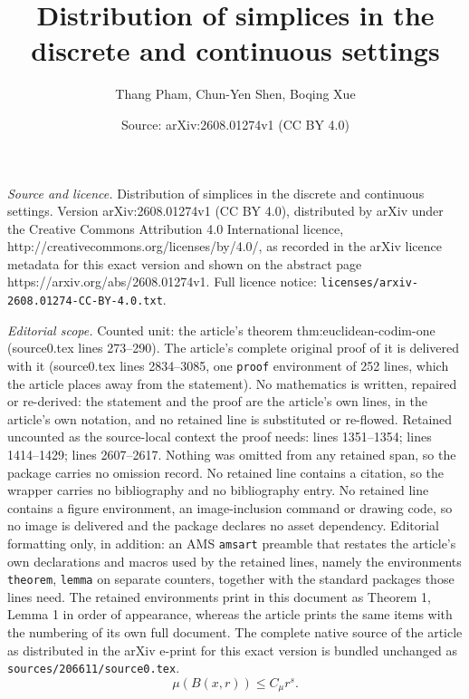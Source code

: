 \documentclass[10pt,a4paper]{amsart}
\title{Distribution of simplices in the discrete and continuous settings}
\author{Thang Pham, Chun-Yen Shen, Boqing Xue}
\date{Source: arXiv:2608.01274v1 (CC BY 4.0)}
\begin{document}
\maketitle

\noindent\emph{Source and licence.} Distribution of simplices in the discrete and continuous settings. Version arXiv:2608.01274v1 (CC BY 4.0), distributed by arXiv under the Creative Commons Attribution 4.0 International licence, http://creativecommons.org/licenses/by/4.0/, as recorded in the arXiv licence metadata for this exact version and shown on the abstract page https://arxiv.org/abs/2608.01274v1. Full licence notice: \texttt{licenses/arxiv-2608.01274-CC-BY-4.0.txt}.\par\smallskip

\noindent\textit{Editorial scope.} Counted unit: the article's theorem thm:euclidean-codim-one (source0.tex lines 273--290). The article's complete original proof of it is delivered with it (source0.tex lines 2834--3085, one \texttt{proof} environment of 252 lines, which the article places away from the statement). No mathematics is written, repaired or re-derived: the statement and the proof are the article's own lines, in the article's own notation, and no retained line is substituted or re-flowed.  Retained uncounted as the source-local context the proof needs: lines 1351--1354; lines 1414--1429; lines 2607--2617.  Nothing was omitted from any retained span, so the package carries no omission record.  No retained line contains a citation, so the wrapper carries no bibliography and no bibliography entry.  No retained line contains a figure environment, an image-inclusion command or drawing code, so no image is delivered and the package declares no asset dependency.  Editorial formatting only, in addition: an AMS \texttt{amsart} preamble that restates the article's own declarations and macros used by the retained lines, namely the environments \texttt{theorem}, \texttt{lemma} on separate counters, together with the standard packages those lines need.  The retained environments print in this document as Theorem 1, Lemma 1 in order of appearance, whereas the article prints the same items with the numbering of its own full document.  The complete native source of the article as distributed in the arXiv e-print for this exact version is bundled unchanged as \texttt{sources/206611/source0.tex}.
\begin{equation}
        \mu(B(x,r))\le C_\mu r^s.
\label{eq:frostman}
\end{equation}
\end{document}

